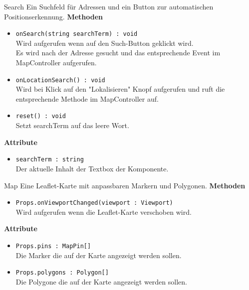     \begin{Class}{Search}
        Ein Suchfeld für Adressen und ein Button zur automatischen Positionserkennung.
        \textbf{Methoden}
        \begin{itemize}
            \item \texttt{onSearch(string searchTerm) : void}
            \\ Wird aufgerufen wenn auf den Such-Button geklickt wird.
            \\ Es wird nach der Adresse gesucht und das entsprechende Event im MapController aufgerufen.
            \item \texttt{onLocationSearch() : void}
            \\ Wird bei Klick auf den "Lokalisieren" Knopf aufgerufen und ruft die entsprechende Methode im MapController auf.
            \item \texttt{reset() : void}
            \\ Setzt searchTerm auf das leere Wort.
        \end{itemize}
        \textbf{Attribute}
        \begin{itemize}
            \item \texttt{searchTerm : string}
            \\ Der aktuelle Inhalt der Textbox der Komponente.
        \end{itemize}
    \end{Class}
    
    \begin{Class}{Map}
        Eine Leaflet-Karte mit anpassbaren Markern und Polygonen.
        \textbf{Methoden}
        \begin{itemize}
            \item \texttt{Props.onViewportChanged(viewport : Viewport)}
            \\ Wird aufgerufen wenn die Leaflet-Karte verschoben wird.
        \end{itemize}
        \textbf{Attribute}
        \begin{itemize}
            \item \texttt{Props.pins : MapPin[]}
            \\ Die Marker die auf der Karte angezeigt werden sollen.
            \item \texttt{Props.polygons : Polygon[]}
            \\ Die Polygone die auf der Karte angezeigt werden sollen.
        \end{itemize}
    \end{Class}
    
